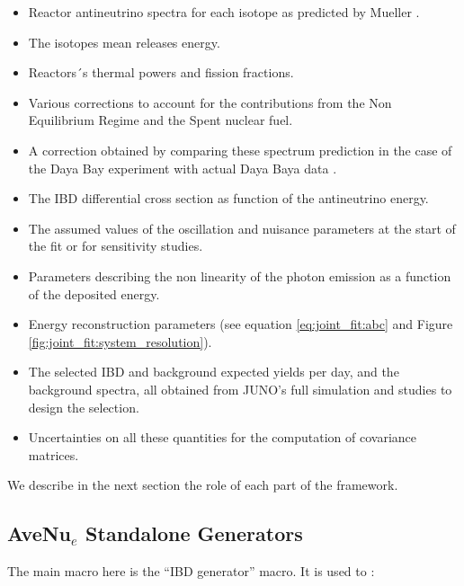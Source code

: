 \documentclass[../main.tex]{subfiles}
\begin{document}
\begin{itemize}
  \item Reactor antineutrino spectra for each isotope as predicted by Mueller \cite{mueller_improved_2011-1}.
  \item The isotopes mean releases energy.
  \item Reactors´s thermal powers and fission fractions.
  \item Various corrections to account for the contributions from the Non Equilibrium Regime and the Spent nuclear fuel.
  \item A correction obtained by comparing these spectrum prediction in the case of the Daya Bay experiment with actual Daya Baya data \cite{daya_bay_collaboration_measurement_2016}.
  \item The IBD differential cross section as function of the antineutrino energy.
  \item The assumed values of the oscillation and nuisance parameters at the start of the fit or for sensitivity studies.
  \item Parameters describing the non linearity of the photon emission as a function of the deposited energy.
  \item Energy reconstruction parameters (see equation \ref{eq:joint_fit:abc} and Figure \ref{fig:joint_fit:system_resolution}).
  \item The selected IBD and background expected yields per day, and the background spectra, all obtained from JUNO's full simulation and studies to design the selection.
  \item Uncertainties on all these quantities for the computation of covariance matrices.
\end{itemize}
\hfill

We describe in the next section the role of each part of the framework.


\subsection{AveNu$_e$ Standalone Generators}

The main macro here is the ``IBD generator'' macro. It is used to :
\end{document}
